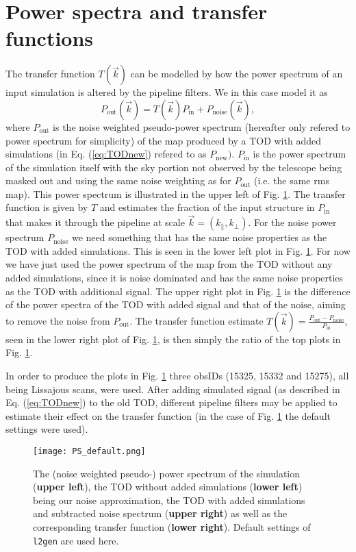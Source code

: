 \documentclass{aastex62}
\begin{document}
\section*{Power spectra and transfer functions}
The transfer function $T(\vec{k})$ can be modelled by how the power spectrum of an input simulation is altered by the pipeline filters. We in this case model it as 
\begin{equation}
    P_\mathrm{out}(\vec{k}) = T(\vec{k})P_\mathrm{in} + P_\mathrm{noise}(\vec{k}),\label{eq:T}
\end{equation}
where $P_\mathrm{out}$ is the noise weighted pseudo-power spectrum (hereafter only refered to power spectrum for simplicity) of the map produced by a TOD with added simulations (in Eq. (\ref{eq:TODnew}) refered to as $P_\mathrm{new})$. $P_\mathrm{in}$ is the power spectrum of the simulation itself with the sky portion not observed by the telescope being masked out and using the same noise weighting as for $P_\mathrm{out}$ (i.e. the same rms map). This power spectrum is illustrated in the upper left of Fig. \ref{fig:fig0}. The transfer function is given by $T$ and estimates the fraction of the input structure in $P_\mathrm{in}$ that makes it through the pipeline at scale $\vec{k} = (k_\parallel, k_\bot)$. For the noise power spectrum $P_\mathrm{noise}$ we need something that has the same noise properties as the TOD with added simulations. This is seen in the lower left plot in Fig. \ref{fig:fig0}. For now we have just used the power spectrum of the map from the TOD without any added simulations, since it is noise dominated and has the same noise properties as the TOD with additional signal. The upper right plot in Fig. \ref{fig:fig0} is the difference of the power spectra of the TOD with added signal and that of the noise, aiming to remove the noise from $P_\mathrm{out}$. The transfer function estimate $T(\vec{k}) = \frac{P_\mathrm{out}-P_\mathrm{noise}}{P_\mathrm{in}}$, seen in the lower right plot of Fig. \ref{fig:fig0}, is then simply the ratio of the top plots in Fig. \ref{fig:fig0}.

In order to produce the plots in Fig. \ref{fig:fig0} three obsIDs (15325, 15332 and 15275), all being Lissajous scans, were used. After adding simulated signal (as described in Eq. (\ref{eq:TODnew}) to the old TOD, different pipeline filters may be applied to estimate their effect on the transfer function (in the case of Fig. \ref{fig:fig0} the default settings were used).

\begin{figure}
    \texttt{[image: PS\_default.png]}
    \caption{The (noise weighted pseudo-) power spectrum of the simulation (\textbf{upper left}), the TOD without added simulations (\textbf{lower left}) being our noise approximation, the TOD with added simulations and subtracted noise spectrum (\textbf{upper right}) as well as the corresponding transfer function (\textbf{lower right}). Default settings of \texttt{l2gen} are used here.}
    \label{fig:fig0}
\end{figure}
\end{document}
